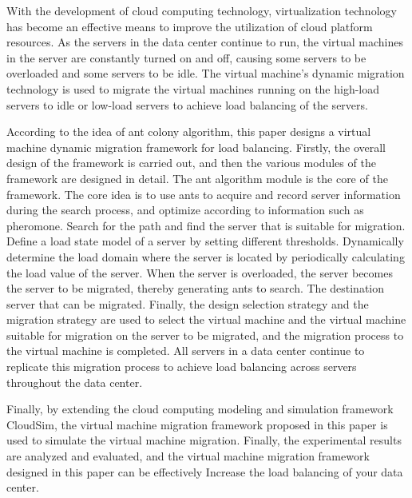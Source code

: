 \begin{enabstract}
With the development of cloud computing technology, virtualization technology has become an effective means to improve the utilization of cloud platform resources. As the servers in the data center continue to run, the virtual machines in the server are constantly turned on and off, causing some servers to be overloaded and some servers to be idle. The virtual machine's dynamic migration technology is used to migrate the virtual machines running on the high-load servers to idle or low-load servers to achieve load balancing of the servers.

According to the idea of ​​ant colony algorithm, this paper designs a virtual machine dynamic migration framework for load balancing. Firstly, the overall design of the framework is carried out, and then the various modules of the framework are designed in detail. The ant algorithm module is the core of the framework. The core idea is to use ants to acquire and record server information during the search process, and optimize according to information such as pheromone. Search for the path and find the server that is suitable for migration. Define a load state model of a server by setting different thresholds. Dynamically determine the load domain where the server is located by periodically calculating the load value of the server. When the server is overloaded, the server becomes the server to be migrated, thereby generating ants to search. The destination server that can be migrated. Finally, the design selection strategy and the migration strategy are used to select the virtual machine and the virtual machine suitable for migration on the server to be migrated, and the migration process to the virtual machine is completed. All servers in a data center continue to replicate this migration process to achieve load balancing across servers throughout the data center.

Finally, by extending the cloud computing modeling and simulation framework CloudSim, the virtual machine migration framework proposed in this paper is used to simulate the virtual machine migration. Finally, the experimental results are analyzed and evaluated, and the virtual machine migration framework designed in this paper can be effectively Increase the load balancing of your data center.

\end{enabstract}
